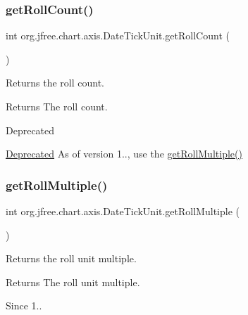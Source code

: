\subsubsection{\texorpdfstring{get\+Roll\+Count()}{getRollCount()}}
{\footnotesize\ttfamily int org.\+jfree.\+chart.\+axis.\+Date\+Tick\+Unit.\+get\+Roll\+Count (\begin{DoxyParamCaption}{ }\end{DoxyParamCaption})}

Returns the roll count.

\begin{DoxyReturn}{Returns}
The roll count.
\end{DoxyReturn}
\begin{DoxyRefDesc}{Deprecated}
\item[\mbox{\hyperlink{deprecated__deprecated000021}{Deprecated}}]As of version 1.., use the \mbox{\hyperlink{classorg_1_1jfree_1_1chart_1_1axis_1_1_date_tick_unit_af03898b2b6fb14ebfce9bee5973951d7}{get\+Roll\+Multiple()}}\end{DoxyRefDesc}
\mbox{\label{classorg_1_1jfree_1_1chart_1_1axis_1_1_date_tick_unit_af03898b2b6fb14ebfce9bee5973951d7}} 
\subsubsection{\texorpdfstring{get\+Roll\+Multiple()}{getRollMultiple()}}
{\footnotesize\ttfamily int org.\+jfree.\+chart.\+axis.\+Date\+Tick\+Unit.\+get\+Roll\+Multiple (\begin{DoxyParamCaption}{ }\end{DoxyParamCaption})}

Returns the roll unit multiple.

\begin{DoxyReturn}{Returns}
The roll unit multiple.
\end{DoxyReturn}
\begin{DoxySince}{Since}
1.. 
\end{DoxySince}
\mbox{\label{classorg_1_1jfree_1_1chart_1_1axis_1_1_date_tick_unit_a361da4f82440c919d106022afb7bd4e3}} 
